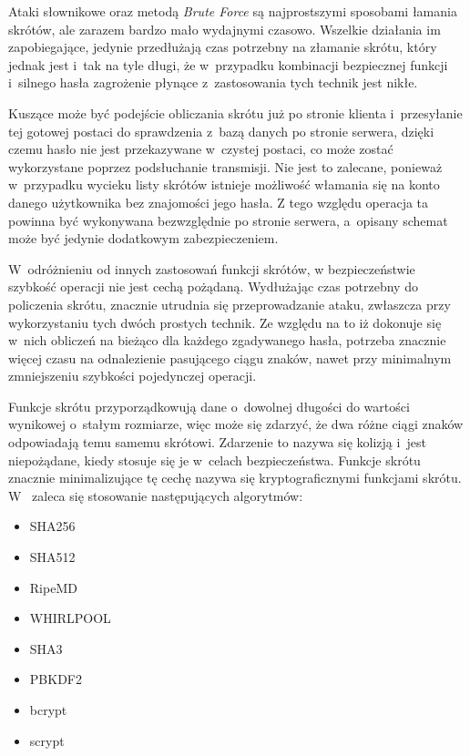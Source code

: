 \documentclass[11pt]{aghdpl}
\begin{document}
Ataki słownikowe oraz metodą \emph{Brute Force} są najprostszymi sposobami łamania skrótów, ale zarazem bardzo mało wydajnymi czasowo. Wszelkie działania im zapobiegające, jedynie przedłużają czas potrzebny na złamanie skrótu, który jednak jest i~tak na tyle długi, że w~przypadku kombinacji bezpiecznej funkcji i~silnego hasła zagrożenie płynące z~zastosowania tych technik jest nikłe.

Kuszące może być podejście obliczania skrótu już po stronie klienta i~przesyłanie tej gotowej postaci do sprawdzenia z~bazą danych po stronie serwera, dzięki czemu hasło nie jest przekazywane w~czystej postaci, co może zostać wykorzystane poprzez podsłuchanie transmisji. Nie jest to zalecane, ponieważ w~przypadku wycieku listy skrótów istnieje możliwość włamania się na konto danego użytkownika bez znajomości jego hasła. Z tego względu operacja ta powinna być wykonywana bezwzględnie po stronie serwera, a~opisany schemat może być jedynie dodatkowym zabezpieczeniem.

W~odróżnieniu od innych zastosowań funkcji skrótów, w bezpieczeństwie szybkość operacji nie jest cechą pożądaną. Wydłużając czas potrzebny do policzenia skrótu, znacznie utrudnia się przeprowadzanie ataku, zwłaszcza przy wykorzystaniu tych dwóch prostych technik. Ze względu na to iż dokonuje się w~nich obliczeń na bieżąco dla każdego zgadywanego hasła, potrzeba znacznie więcej czasu na odnalezienie pasującego ciągu znaków, nawet przy minimalnym zmniejszeniu szybkości pojedynczej operacji.

Funkcje skrótu przyporządkowują dane o~dowolnej długości do wartości wynikowej o~stałym rozmiarze, więc może się zdarzyć, że dwa różne ciągi znaków odpowiadają temu samemu skrótowi. Zdarzenie to nazywa się kolizją i~jest niepożądane, kiedy stosuje się je w~celach bezpieczeństwa. Funkcje skrótu znacznie minimalizujące tę cechę nazywa się kryptograficznymi funkcjami skrótu. W~\cite{CSH} zaleca się stosowanie następujących algorytmów:

\begin{itemize}
\item SHA256
\item SHA512
\item RipeMD
\item WHIRLPOOL
\item SHA3
\item PBKDF2
\item bcrypt
\item scrypt		
\end{itemize}
\end{document}
